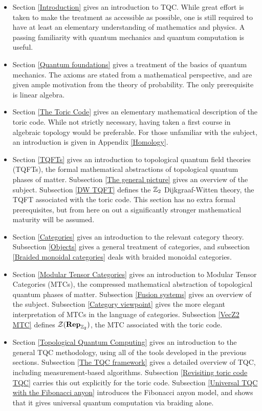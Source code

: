 \documentclass{article}
\theoremstyle{definition}
\numberwithin{figure}{section}
\begin{document}
\begin{itemize}
\item Section \ref{Introduction} gives an introduction to TQC. While great effort is taken to make the treatment as accessible as possible, one is still required to have at least an elementary understanding of mathematics and physics. A passing familiarity with quantum mechanics and quantum computation is useful.

\item Section \ref{Quantum foundations} gives a treatment of the basics of quantum mechanics. The axioms are stated from a mathematical perspective, and are given ample motivation from the theory of probability. The only prerequisite is linear algebra.

\item Section \ref{The Toric Code} gives an elementary mathematical description of the toric code. While not strictly necessary, having taken a first course in algebraic topology would be preferable. For those unfamiliar with the subject, an introduction is given in Appendix \ref{Homology}. 

\item Section \ref{TQFTs} gives an introduction to topological quantum field theories (TQFTs), the formal mathematical abstractions of topological quantum phases of matter. Subsection \ref{The general picture} gives an overview of the subject. Subsection \ref{DW TQFT} defines the $\mathbb{Z}_2$ Dijkgraaf-Witten theory, the TQFT associated with the toric code. This section has no extra formal prerequisites, but from here on out a significantly stronger mathematical maturity will be assumed.

\item Section \ref{Categories} gives an introduction to the relevant category theory. Subsection \ref{Objects} gives a general treatment of categories, and subsection \ref{Braided monoidal categories} deals with braided monoidal categories.

\item Section \ref{Modular Tensor Categories} gives an introduction to Modular Tensor Categories (MTCs), the compressed mathematical abstraction of topological quantum phases of matter. Subsection \ref{Fusion systems} gives an overview of the subject. Subsection \ref{Category viewpoint} gives the more elegant interpretation of MTCs in the language of categories. Subsection \ref{VecZ2 MTC} defines $\mathcal{Z}(\bold{Rep}_{\mathbb{Z}_2})$, the MTC associated with the toric code.

\item Section \ref{Topological Quantum Computing} gives an introduction to the general TQC methodology, using all of the tools developed in the previous sections. Subsection \ref{The TQC framework} gives a detailed overview of TQC, including measurement-based algorithms. Subsection \ref{Revisiting toric code TQC} carries this out explicitly for the toric code. Subsection \ref{Universal TQC with the Fibonacci anyon} introduces the Fibonacci anyon model, and shows that it gives universal quantum computation via braiding alone.

\end{itemize}
\end{document}
